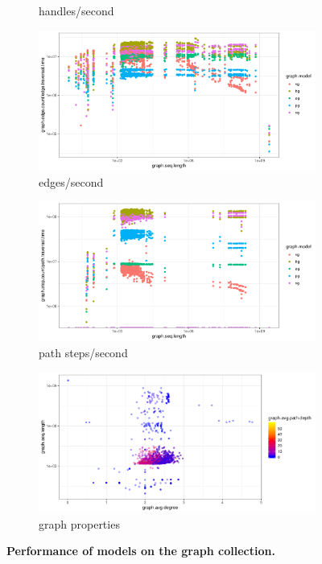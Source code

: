 \documentclass{article}
\begin{document}
\begin{figure}
\begin{subfigure}[t]{0.5\textwidth}
    \caption{handles/second}
  \end{subfigure}
  \begin{subfigure}[t]{0.5\textwidth}
    \centering
    \includegraphics[width=1.0\textwidth]{figures/edge_enumeration_time.pdf}
    \caption{edges/second}
  \end{subfigure}
  \begin{subfigure}[t]{0.5\textwidth}
    \centering
    \includegraphics[width=1.0\textwidth]{figures/step_enumeration_time.pdf}
    \caption{path steps/second}
  \end{subfigure}
  \begin{subfigure}[t]{0.5\textwidth}
    \centering
    \includegraphics[width=1.0\textwidth]{figures/graph_summary.pdf}
    \caption{graph properties}
  \end{subfigure}
  \caption{
    \label{fig:prof}
    \textbf{Performance of models on the graph collection. }
    }
\end{figure}
\end{document}

